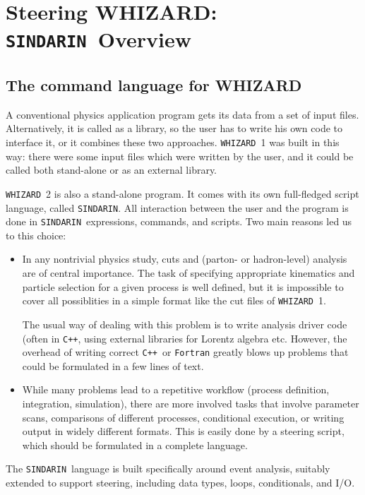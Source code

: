 \documentclass[12pt]{book}
\newcommand{\ttt}[1]{\texttt{#1}}
\newcommand{\whizard}{\ttt{WHIZARD}}
\newcommand{\sindarin}{\ttt{SINDARIN}}
\newcommand{\cpp}{\ttt{C++}}
\begin{document}

\chapter{Steering WHIZARD: \sindarin\ Overview}
\label{chap:sindarinintro}


\section{The command language for WHIZARD}
A conventional physics application program gets its data from a set of input
files.  Alternatively, it is called as a library, so the user has to write his
own code to interface it, or it combines these two approaches.  \whizard~1 was
built in this way: there were some input files which were written by the user,
and it could be called both stand-alone or as an external library.

\whizard~2 is also a stand-alone program.  It comes with its own full-fledged
script language, called \sindarin.  All interaction between the user and the
program is done in \sindarin\ expressions, commands, and scripts.  Two main
reasons led us to this choice:
\begin{itemize}
\item
  In any nontrivial physics study, cuts and (parton- or hadron-level) analysis
  are of central importance.  The task of specifying appropriate kinematics
  and particle selection for a given process is well defined, but it is
  impossible to cover all possiblities in a simple format like the cut files
  of \whizard~1.

  The usual way of dealing with this problem is to write analysis driver code
  (often in \cpp, using external libraries for Lorentz algebra etc.  However,
  the overhead of writing correct \cpp\ or \ttt{Fortran} greatly blows up problems
  that could be formulated in a few lines of text.
\item
  While many problems lead to a repetitive workflow (process definition,
  integration, simulation), there are more involved tasks that involve
  parameter scans, comparisons of different processes, conditional execution,
  or writing output in widely different formats.  This is easily done by a
  steering script, which should be formulated in a complete language.
\end{itemize}
The \sindarin\ language is built specifically around event analysis, suitably
extended to support steering, including data types, loops, conditionals, and
I/O.
\end{document}
